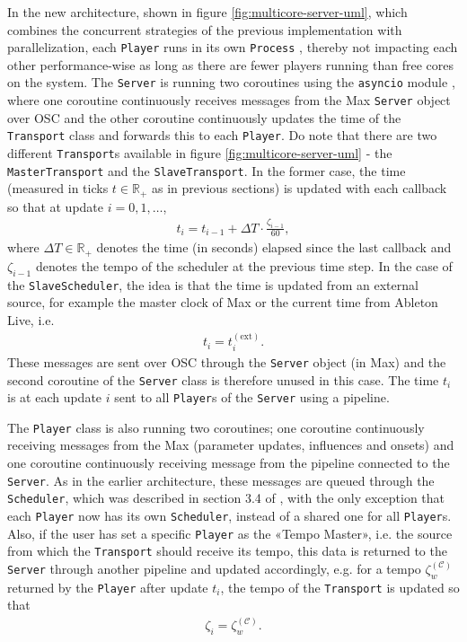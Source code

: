 In the new architecture, shown in figure \ref{fig:multicore-server-uml}, which combines the concurrent strategies of the previous implementation with parallelization, each \texttt{Player} runs in its own \texttt{Process} \cite{pymultiproc}, thereby not impacting each other performance-wise as long as there are fewer players running than free cores on the system. The \texttt{Server} is running two coroutines using the \texttt{asyncio} module \cite{pyasyncio}, where one coroutine continuously receives messages from the Max \texttt{Server} object over OSC and the other coroutine continuously updates the time of the \texttt{Transport} class and forwards this to each \texttt{Player}. Do note that there are two different \texttt{Transport}s available in figure \ref{fig:multicore-server-uml} - the \texttt{MasterTransport} and the \texttt{SlaveTransport}. In the former case, the time (measured in ticks $t \in \mathbb R_+$ as in previous sections) is updated with each callback so that at update $i = 0,1,\dots$,
	\begin{align}
		t_i = t_{i-1} + \Delta T \cdot \frac{\zeta_{i-1}}{60},
	\end{align}
	where $\Delta T \in \mathbb R_+$ denotes the time (in seconds) elapsed since the last callback and $\zeta_{i-1}$ denotes the tempo of the scheduler at the previous time step. In the case of the \texttt{SlaveScheduler}, the idea is that the time is updated from an external source, for example the master clock of Max or the current time from Ableton Live, i.e.
		\begin{align}
			t_i = t^{(\text{ext})}_i	.
		\end{align}
	These messages are sent over OSC through the \texttt{Server} object (in Max) and the second coroutine of the \texttt{Server} class is therefore unused in this case. The time $t_i$ is at each update $i$ sent to all \texttt{Player}s of the \texttt{Server} using a pipeline.
	
The \texttt{Player} class is also running two coroutines; one coroutine continuously receiving messages from the Max (parameter updates, influences and  onsets) and one coroutine continuously receiving message from the pipeline connected to the \texttt{Server}. As in the earlier architecture, these messages are queued through the \texttt{Scheduler}, which was described in section 3.4 of \cite{borg2020dynamic}, with the only exception that each \texttt{Player} now has its own \texttt{Scheduler}, instead of a shared one for all \texttt{Player}s. Also, if the user has set a specific \texttt{Player} as the «Tempo Master», i.e. the source from which the \texttt{Transport} should receive its tempo, this data is returned to the \texttt{Server} through another pipeline and updated accordingly, e.g. for a tempo $\zeta^{(\mathcal C)}_w$ returned by the \texttt{Player} after update $t_i$, the tempo of the \texttt{Transport} is updated so that
	\begin{align}
		\zeta_i = \zeta^{(\mathcal C)}_w.
	\end{align}
 
	



